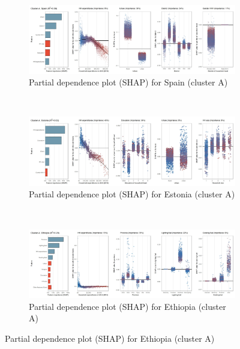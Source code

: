 \begin{figure}[ht!]\ContinuedFloat
    \centering
   \begin{subfigure}[b]{\textwidth}
          \centering
         \caption{Partial dependence plot (SHAP) for Spain (cluster A)}
         \label{fig:5b_ESP}
         \includegraphics[width=\textwidth]{Figure 5b/Figure_5b_ESP}
     \end{subfigure}
    \\
    \vspace{0.5cm}
   \begin{subfigure}[b]{\textwidth}   
         \centering
         \caption{Partial dependence plot (SHAP) for Estonia (cluster A)}
         \label{fig:5b_EST}
         \includegraphics[width=\textwidth]{Figure 5b/Figure_5b_EST}
         \end{subfigure}
    \\
    \vspace{0.5cm}
   \begin{subfigure}[b]{\textwidth}
         \centering
         \caption{Partial dependence plot (SHAP) for Ethiopia (cluster A)}
         \label{fig:5b_ETH}
         \includegraphics[width=\textwidth]{Figure 5b/Figure_5b_ETH} \end{subfigure}

\end{figure}

